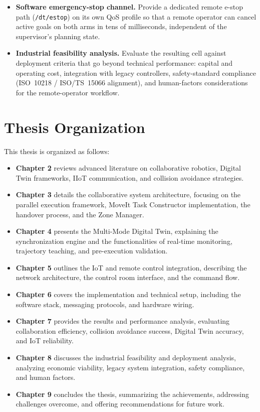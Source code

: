 \begin{itemize}
    \item \textbf{Software emergency-stop channel.} Provide a dedicated remote e-stop path (\texttt{/dt/estop}) on its own QoS profile so that a remote operator can cancel active goals on both arms in tens of milliseconds, independent of the supervisor's planning state.

    \item \textbf{Industrial feasibility analysis.} Evaluate the resulting cell against deployment criteria that go beyond technical performance: capital and operating cost, integration with legacy controllers, safety-standard compliance (ISO~10218 / ISO/TS~15066 alignment), and human-factors considerations for the remote-operator workflow.
\end{itemize}
\clearpage

\section{Thesis Organization}
This thesis is organized as follows:
\begin{itemize}
    \item \textbf{Chapter 2} reviews advanced literature on collaborative robotics, Digital Twin frameworks, IIoT communication, and collision avoidance strategies.
    \item \textbf{Chapter 3} details the collaborative system architecture, focusing on the parallel execution framework, MoveIt Task Constructor implementation, the handover process, and the Zone Manager.
    \item \textbf{Chapter 4} presents the Multi-Mode Digital Twin, explaining the synchronization engine and the functionalities of real-time monitoring, trajectory teaching, and pre-execution validation.
    \item \textbf{Chapter 5} outlines the IoT and remote control integration, describing the network architecture, the control room interface, and the command flow.
    \item \textbf{Chapter 6} covers the implementation and technical setup, including the software stack, messaging protocols, and hardware wiring.
    \item \textbf{Chapter 7} provides the results and performance analysis, evaluating collaboration efficiency, collision avoidance success, Digital Twin accuracy, and IoT reliability.
    \item \textbf{Chapter 8} discusses the industrial feasibility and deployment analysis, analyzing economic viability, legacy system integration, safety compliance, and human factors.
    \item \textbf{Chapter 9} concludes the thesis, summarizing the achievements, addressing challenges overcome, and offering recommendations for future work.
\end{itemize}

\clearpage